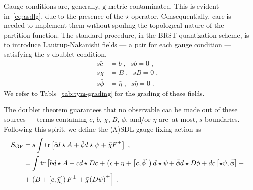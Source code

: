 \documentclass[main.tex]{subfiles}
\begin{document}
Gauge conditions are, generally, $ \mathrm{g} $ metric-contaminated. This is evident in~\eqref{eq:asdlg}, due to the presence of the $\star$ operator. Consequentially, care is needed to implement them without spoiling the topological nature of the partition function. The standard procedure, in the BRST quantization scheme, is to introduce Lautrup-Nakanishi fields --- a pair for each gauge condition --- satisfying the $s$-doublet condition,
\begin{subequations}\label{eq:anti-ghost_lautrup-nakanishi}
  \begin{align}
    s \bar{ c }  & = b \;, \;\; s b  = 0 \;,                    \\
    s \bar{\chi} & = B \;, \;\; s B        = 0 \;,              \\
    s \bar{\phi} & = \bar{\eta} \;, \;\; s \bar{ \eta } = 0 \;.
  \end{align}
\end{subequations}
We refer to Table~\ref{tab:tym-grading} for the grading of these fields.

The doublet theorem guarantees that no observable can be made out of these sources --- terms containing $\bar{c}$, $b$, $\bar{\chi}$, $B$, $\bar{\phi}$, and/or $\bar{\eta}$ are, at most, $s$-boundaries. Following this spirit, we define the (A){}SDL gauge fixing action as
\begin{subequations}\label{eq:tym-gf-action}
  \begin{align}
    S_{\text{GF}} & = s \int \operatorname{tr} \left[ \bar{c} d \star A + \bar{\phi} d \star \psi + \bar{\chi} F^{\pm} \right] \;,                                                                                                                                 \\
                  & =  \int \operatorname{tr} \left[ b d \star A - \bar{c} d \star Dc + \left( \bar{c} + \bar{\eta} + \left[ c,\bar{\phi} \right] \right) d \star \psi + \bar{\phi} d \star D \phi + d c \left[ \star \psi ,\bar{\phi} \right] + \right. \nonumber \\
                  & + \left. \left( B + \left[ c,\bar{\chi} \right] \right) F^{\pm} + \bar{\chi} {\left( D \psi \right)}^{ \pm } \right] \;.
  \end{align}
\end{subequations}
\end{document}
